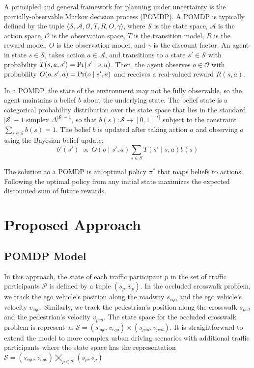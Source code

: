 \documentclass[conference]{IEEEtran}
\begin{document}
A principled and general framework for planning under uncertainty is the partially-observable Markov decision process (POMDP). A POMDP is typically defined by the tuple $\langle \mathcal{S},\mathcal{A}, \mathcal{O}, T, R, O, \gamma \rangle$, where $\mathcal{S}$ is the state space, $\mathcal{A}$ is the action space, $\mathcal{O}$ is the observation space, $T$ is the transition model, $R$ is the reward model, $O$ is the observation model, and $\gamma$ is the discount factor. An agent in state $s \in \mathcal{S}$, takes action $a \in \mathcal{A}$, and transitions to a state $s' \in \mathcal{S}$ with probability $T(s, a, s') = \textnormal{Pr}(s' \mid s, a)$. Then, the agent observes $o \in \mathcal{O}$ with probability $O(o, s',a) = \textnormal{Pr}(o\mid s', a)$ and receives a real-valued reward $R(s, a)$. 

In a POMDP, the state of the environment may not be fully observable, so the agent maintains a belief $b$ about the underlying state. The belief state is a categorical probability distribution over the state space that lies in the standard $|\mathcal{S}|-1$ simplex $\Delta^{|\mathcal{S}|-1}$, so that $b(s): \mathcal{S} \rightarrow [0,1]^{|\mathcal{S}|}$ subject to the constraint $\sum_{s\in \mathcal{S}} b(s) = 1$. The belief $b$ is updated after taking action $a$ and observing $o$ using the Bayesian belief update:
\begin{equation}
    b'(s')~\propto~O(o \mid s', a) \sum_{s \in S} T(s' \mid s, a) b(s)
\end{equation}

The solution to a POMDP is an optimal policy $\pi^*$ that maps beliefs to actions. Following the optimal policy from any initial state maximizes the expected discounted sum of future rewards. %

\section{Proposed Approach}
\label{sec:proposed-approach}

\subsection{POMDP Model}

In this approach, the state of each traffic participant $p$ in the set of traffic participants $\mathcal{P}$ is defined by a tuple $(s_p, v_p)$. In the occluded crosswalk problem, we track the ego vehicle's position along the roadway $s_{ego}$ and the ego vehicle's velocity $v_{ego}$. Similarly, we track the pedestrian's position along the crosswalk $s_{ped}$ and the pedestrian's velocity $v_{ped}$. The state space for the occluded crosswalk problem is represent as $\mathcal{S} = (s_{ego}, v_{ego}) \times (s_{ped}, v_{ped})$. It is straightforward to extend the model to more complex urban driving scenarios with additional traffic participants where the state space has the representation $\mathcal{S} = (s_{ego}, v_{ego}) \bigtimes_{p\in\mathcal{P}}(s_p, v_p)$
\end{document}
